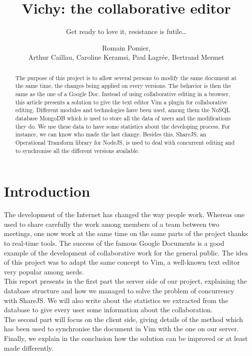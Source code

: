 \documentclass{llncs}
\begin{document}
\title{Vichy: the collaborative editor}
\subtitle{Get ready to love it, resistance is futile\ldots}

\author{Romain Pomier,\\Arthur Caillau, Caroline Keramsi, Paul Lagrée, Bertrand Mermet}

\maketitle

\begin{abstract}

The purpose of this project is to allow several persons to modify the same
document at the same time, the changes being applied on every versions.
The behavior is then the same as the one of a Google Doc.
Instead of using collaborative editing in a browser, this article presents a
solution to give the text editor Vim a plugin for collaborative editing.
Different modules and technologies have been used, among them the NoSQL
database MongoDB which is used to store all the data of users and the
modifications they do.
We use these data to have some statistics about the developing process.
For instance, we can know who made the last change. Besides this, ShareJS, an
Operational Transform library for NodeJS, is used to deal with concurrent
editing and to synchronise all the different versions available.

\end{abstract}

\section{Introduction}\label{sec:Introduction}

The development of the Internet has changed the way people work.
Whereas one used to share carefully the work among members of a team between
two meetings, one now work at the same time on the same parts of the project
thanks to real-time tools.
The success of the famous Google Documents is a good example of the development
of collaborative work for the general public.
The idea of this project was to adapt the same concept to Vim, a well-known
text editor very popular among nerds.\\
This report presents in the first part the server side of our project, explaining
the database structure and how we managed to solve the problem of concurrency with ShareJS.
We will also write about the statistics we extracted from the database to give
every user some information about the collaboration.\\
The second part will focus on the client side, giving details of the method
which has been used to synchronise the document in Vim with the one on our server.\\
Finally, we explain in the conclusion how the solution can be improved or at
least made differently.
\end{document}
